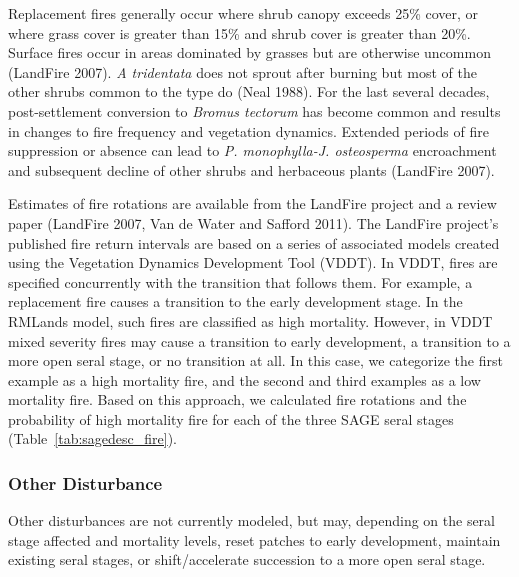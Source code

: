 Replacement fires generally occur where shrub canopy exceeds 25\% cover, or where grass cover is greater than 15\% and shrub cover is greater than 20\%. Surface fires occur in areas dominated by grasses but are otherwise uncommon (LandFire 2007). \emph{A tridentata} does not sprout after burning but most of the other shrubs common to the type do (Neal 1988). For the last several decades, post-settlement conversion to \emph{Bromus tectorum} has become common and results in changes to fire frequency and vegetation dynamics. Extended periods of fire suppression or absence can lead to \emph{P. monophylla-J. osteosperma} encroachment and subsequent decline of other shrubs and herbaceous plants (LandFire 2007). 

Estimates of fire rotations are available from the LandFire project and a review paper (LandFire 2007, Van de Water and Safford 2011). The LandFire project’s published fire return intervals are based on a series of associated models created using the Vegetation Dynamics Development Tool (VDDT). In VDDT, fires are specified concurrently with the transition that follows them. For example, a replacement fire causes a transition to the early development stage. In the RMLands model, such fires are classified as high mortality. However, in VDDT mixed severity fires may cause a transition to early development, a transition to a more open seral stage, or no transition at all. In this case, we categorize the first example as a high mortality fire, and the second and third examples as a low mortality fire. Based on this approach, we calculated fire rotations and the probability of high mortality fire for each of the three SAGE seral stages (Table~\ref{tab:sagedesc_fire}). 

\subsubsection{Other Disturbance}
Other disturbances are not currently modeled, but may, depending on the seral stage affected and mortality levels, reset patches to early development, maintain existing seral stages, or shift/accelerate succession to a more open seral stage. 

